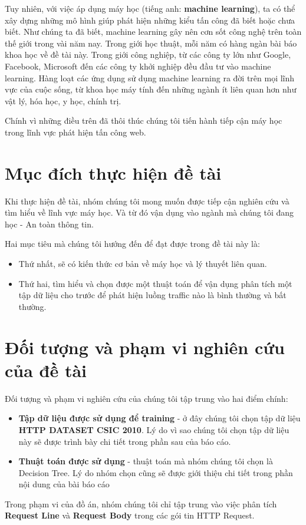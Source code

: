 \documentclass[../main-report.tex]{subfiles}
\begin{document}
Tuy nhiên, với việc áp dụng máy học (tiếng anh: \textbf{machine learning}), ta có thể xây dựng những mô hình giúp phát hiện những kiểu tấn công đã biết hoặc chưa biết. Như chúng ta đã biết, machine learning gây nên cơn sốt công nghệ trên toàn thế giới trong vài năm nay. Trong giới học thuật, mỗi năm có hàng ngàn bài báo khoa học về đề tài này. Trong giới công nghiệp, từ các công ty lớn như Google, Facebook, Microsoft đến các công ty khởi nghiệp đều đầu tư vào machine learning. Hàng loạt các ứng dụng sử dụng machine learning ra đời trên mọi lĩnh vực của cuộc sống, từ khoa học máy tính đến những ngành ít liên quan hơn như vật lý, hóa học, y học, chính trị.

Chính vì những điều trên đã thôi thúc chúng tôi tiến hành tiếp cận máy học trong lĩnh vực phát hiện tấn công web.

\section*{Mục đích thực hiện đề tài}
Khi thực hiện đề tài, nhóm chúng tôi mong muốn được tiếp cận nghiên cứu và tìm hiểu về lĩnh vực máy học. Và từ đó vận dụng vào ngành mà chúng tôi đang học - An toàn thông tin.

Hai mục tiêu mà chúng tôi hướng đến để đạt được trong đề tài này là:

\begin{itemize}
\item Thứ nhất, sẽ có kiến thức cơ bản về máy học và lý thuyết liên quan.
\item Thứ hai, tìm hiểu và chọn được một thuật toán để vận dụng phân tích một tập dữ liệu cho trước để phát hiện luồng traffic nào là bình thường và bất thường.
\end{itemize}

\section*{Đối tượng và phạm vi nghiên cứu của đề tài}
Đối tượng và phạm vi nghiên cứu của chúng tôi tập trung vào hai điểm chính:

\begin{itemize}
\item \textbf{Tập dữ liệu được sử dụng để training} - ở đây chúng tôi chọn tập dữ liệu \textbf{HTTP DATASET CSIC 2010}. Lý do vì sao chúng tôi chọn tập dữ liệu này sẽ được trình bày chi tiết trong phần sau của báo cáo.
\item \textbf{Thuật toán được sử dụng} - thuật toán mà nhóm chúng tôi chọn là Decision Tree. Lý do nhóm chọn cũng sẽ được giới thiệu chi tiết trong phần nội dung của bài báo cáo
\end{itemize}

Trong phạm vi của đồ án, nhóm chúng tôi chỉ tập trung vào việc phân tích \textbf{Request Line} và \textbf{Request Body} trong các gói tin HTTP Request.
\end{document}
